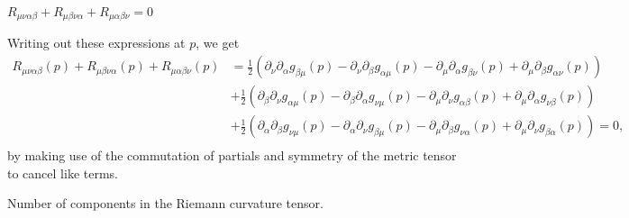 \documentclass{../../templates/lkx_pset}
\begin{document}
\begin{solution}

	\begin{part}{}
		$R_{\mu\nu\alpha\beta}+R_{\mu\beta\nu\alpha}+R_{\mu\alpha\beta\nu}=0$
	\end{part}
	Writing out these expressions at $p$, we get
	\[
		\begin{aligned}
			R_{\mu\nu\alpha\beta}(p)+R_{\mu\beta\nu\alpha}(p)+R_{\mu\alpha\beta\nu}(p)
			 & =
			\frac{1}{2}\left(\partial_\nu\partial_\alpha g_{\beta\mu}(p) -\partial_\nu\partial_\beta g_{\alpha\mu}(p) - \partial_\mu\partial_\alpha g_{\beta\nu}(p) + \partial_\mu\partial_\beta g_{\alpha\nu}(p)\right)        \\
			 & +
			\frac{1}{2}\left(\partial_\beta\partial_\nu g_{\alpha\mu}(p) -\partial_\beta\partial_\alpha g_{\nu\mu}(p) - \partial_\mu\partial_\nu g_{\alpha\beta}(p) + \partial_\mu\partial_\alpha g_{\nu\beta}(p)\right)        \\
			 & +\frac{1}{2}\left(\partial_\alpha\partial_\beta g_{\nu\mu}(p) -\partial_\alpha\partial_\nu g_{\beta\mu}(p) - \partial_\mu\partial_\beta g_{\nu\alpha}(p) + \partial_\mu\partial_\nu g_{\beta\alpha}(p)\right)=0, \\
		\end{aligned}
	\]
	by making use of the commutation of partials and symmetry of the metric tensor to cancel like terms.
\end{solution}

\begin{problem}{8}
Number of components in the Riemann curvature tensor.
\end{problem}
\end{document}
